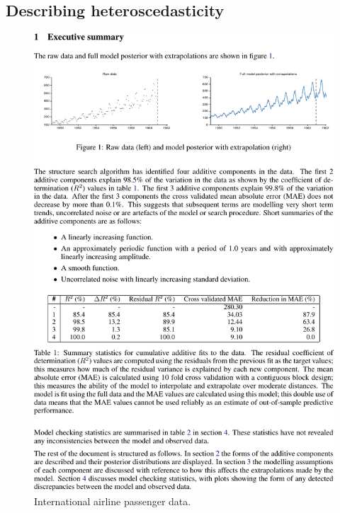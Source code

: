 \documentclass[letterpaper]{article}
\begin{document}
\subsection{Describing heteroscedasticity}
\label{sec:airline}

\begin{figure}[h]
\centering
\includegraphics[trim=0.4cm 16.8cm 8cm 2cm, clip, width=0.98\columnwidth, height=0.45\columnwidth]{airlinepages/pg_0002-crop}
\caption{
International airline passenger data.}
\label{fig:airline}
\end{figure}
\end{document}

